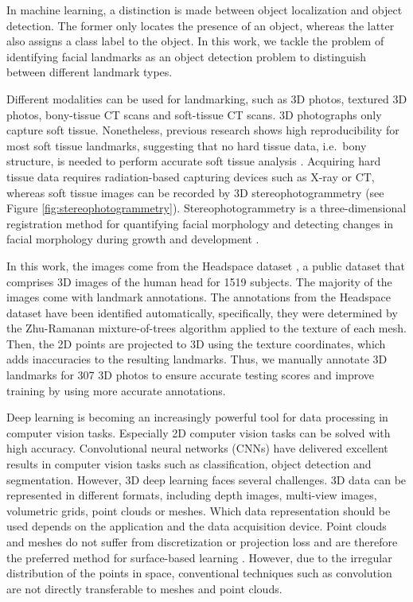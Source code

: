 In machine learning, a distinction is made between object localization and object detection. The former only locates the presence of an object, whereas the latter also assigns a class label to the object. In this work, we tackle the problem of identifying facial landmarks as an object detection problem  to distinguish between different landmark types.

Different modalities can be used for landmarking, such as 3D photos, textured 3D photos, bony-tissue CT scans and soft-tissue CT scans. 3D photographs only capture soft tissue. Nonetheless, previous research shows high reproducibility for most soft tissue landmarks, suggesting that no hard tissue data, i.e.\ bony structure, is needed to perform accurate soft tissue analysis \cite{Plooij2009}. Acquiring hard tissue data requires radi\-ation-based capturing devices such as X-ray or CT, whereas soft tissue images can be recorded by 3D stereo\-photogrammetry (see Figure \ref{fig:stereophotogrammetry}). Stereophotogrammetry is a three-dimensional registration method for quantifying facial morphology and detecting changes in facial morphology during growth and development \cite{Ras1996}.

In this work, the images come from the Headspace dataset \cite{Dai2019}, a public dataset that comprises 3D images of the human head for 1519 subjects. The majority of the images come with landmark annotations. The annotations from the Headspace dataset have been identified automatically, specifically, they were determined by the Zhu-Ramanan mixture-of-trees algorithm \cite{Zhu2012} applied to the texture of each mesh. Then, the 2D points are projected to 3D using the texture coordinates, which adds inaccuracies to the resulting landmarks. Thus, we manually annotate 3D landmarks for 307 3D photos to ensure accurate testing scores and improve training by using more accurate annotations.

Deep learning is becoming an increasingly powerful tool for data processing in computer vision tasks. Especially 2D computer vision tasks can be solved with high accuracy. Convolutional neural networks (CNNs) have delivered excellent results in computer vision tasks such as classification, object detection and segmentation. However, 3D deep learning faces several challenges. 3D data can be represented in different formats, including depth images, multi-view images, volumetric grids, point clouds or meshes. Which data representation should be used depends on the application and the data acquisition device. Point clouds and meshes do not suffer from discretization or projection loss and are therefore the preferred method for surface-based learning \cite{Guo2021}. However, due to the irregular distribution of the points in space, conventional techniques such as convolution are not directly transferable to meshes and point clouds.

